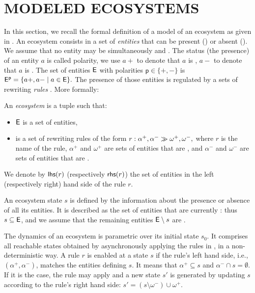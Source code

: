 \documentclass[a4paper,twoside]{article}
\begin{document}
\section{\uppercase{Modeled Ecosystems}}
\label{sec:ecosystems}
In this section, we recall the formal definition of a model of an ecosystem as given in \cite{pommereau-gaucherel2017}. 
An ecosystem consists in a set of \emph{entities} \E that can be present (\On) or absent (\Off). We assume that no entity may be simultaneously \On and \Off. The status (the presence) of an entity $a$ is called polarity, we use $a+$ to denote that $a$ is \On, $a-$ to denote that $a$ is \Off. The set of entities $\mathsf{E}$ with polarities $\mathsf{p} \in \{+,-\}$ is $\mathsf{E^p}= \{a+, a- \mid a \in \mathsf{E}\}.$ 
The presence of those entities is regulated by a sets of rewriting \emph{rules} \Ru.
More formally:

\begin{definition}[Ecosystem]
An \emph{ecosystem} \RR is a tuple \rsys{\E}{\Ru} such that:
\begin{itemize}
\item $\mathsf{E}$ is a set of entities, 
\item \Ru is a set of rewriting rules of the form
$ r: \alpha^+,\alpha^- \gg \omega^+,\omega^-, $
where 
$r$ is the name of the rule, 
$\alpha^+$ and $\omega^+$ are sets of entities that are \On, and 
$\alpha^-$ and $\omega^-$ are sets of entities that are \Off.
\end{itemize}
\end{definition}

We denote by $\mathsf{lhs}(r)$ (respectively $\mathsf{rhs}(r)$) the set of entities in the left (respectively right) hand side of the rule $r$. 

An ecosystem state $s$ is defined by the information 
about the presence or absence of all its entities. It is described as the set of entities that are currently \On: thus 
$s \subseteq  \mathsf{E}$, and we assume  that the remaining entities $\mathsf{E} \setminus s$ are \Off.

The dynamics of an ecosystem \rsys{\E}{\Ru} is parametric over its initial state $s_0$.  
It comprises all reachable states obtained by asynchronously applying the rules in {\Ru}, in a non-deterministic way.
A rule $r$ is enabled at a state $s$ if the rule's left hand side, i.e., $(\alpha^+, \alpha^-)$,
matches the entities defining $s$. 
It means that $\alpha^+\subseteq s$ and $\alpha^- \cap s=\emptyset$.
If it is the case, the rule may apply and 
a new state $s'$ is generated by updating $s$ according to the rule's right hand side: $s'=(s\setminus \omega^-)\cup \omega^+. $
 
\end{document}
